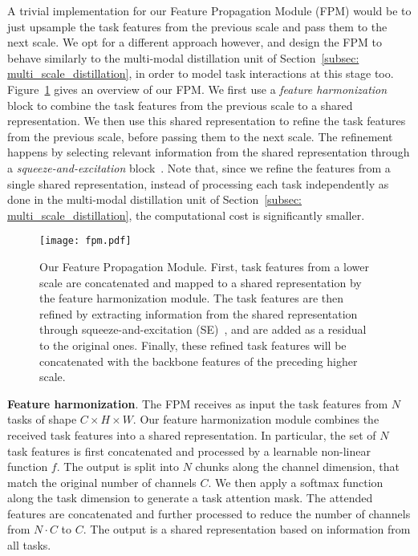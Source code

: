 \documentclass[runningheads]{llncs}
\begin{document}
A trivial implementation for our Feature Propagation Module (FPM) would be to just upsample the task features from the previous scale and pass them to the next scale. We opt for a different approach however, and design the FPM to behave similarly to the multi-modal distillation unit of Section~\ref{subsec: multi_scale_distillation}, in order to model task interactions at this stage too. Figure~\ref{fig: feature_propagation} gives an overview of our FPM. We first use a \textit{feature harmonization} block to combine the task features from the previous scale to a shared representation. We then use this shared representation to refine the task features from the previous scale, before passing them to the next scale. The refinement happens by selecting relevant information from the shared representation through a \textit{squeeze-and-excitation} block~\cite{hu2018squeeze}. Note that, since we refine the features from a single shared representation, instead of processing each task independently as done in the multi-modal distillation unit of Section~\ref{subsec: multi_scale_distillation}, the computational cost is significantly smaller.

\begin{figure}[t]
\centering
\texttt{[image: fpm.pdf]}
\caption{Our Feature Propagation Module. First, task features from a lower scale are concatenated and mapped to a shared representation by the feature harmonization module. The task features are then refined by extracting information from the shared representation through squeeze-and-excitation (SE)~\cite{hu2018squeeze}, and are added as a residual to the original ones. Finally, these refined task features will be concatenated with the backbone features of the preceding higher scale.}
\label{fig: feature_propagation}
\end{figure}

\noindent\textbf{Feature harmonization}.
The FPM receives as input the task features from $N$ tasks of shape $C \times H \times W$. Our feature harmonization module combines the received task features into a shared representation. In particular, the set of $N$ task features is first concatenated and processed by a learnable non-linear function $f$. The output is split into $N$ chunks along the channel dimension, that match the original number of channels $C$. We then apply a softmax function along the task dimension to generate a task attention mask. The attended features are concatenated and further processed to reduce the number of channels from $N \cdot C$ to $C$. The output is a shared representation based on information from all tasks. 
\end{document}
